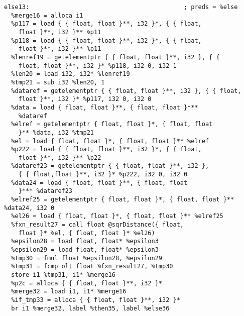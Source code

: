 \documentclass[main.tex]{subfiles}
\begin{document}
{\begin{lstlisting}
else13:                                           ; preds = %else
  %merge16 = alloca i1
  %p117 = load { { float, float }**, i32 }*, { { float,
    float }**, i32 }** %p11
  %p118 = load { { float, float }**, i32 }*, { { float, 
    float }**, i32 }** %p11
  %lenref19 = getelementptr { { float, float }**, i32 }, { { 
    float, float }**, i32 }* %p118, i32 0, i32 1
  %len20 = load i32, i32* %lenref19
  %tmp21 = sub i32 %len20, 1
  %dataref = getelementptr { { float, float }**, i32 }, { { float,
    float }**, i32 }* %p117, i32 0, i32 0
  %data = load { float, float }**, { float, float }***
    %dataref
  %elref = getelementptr { float, float }*, { float, float
    }** %data, i32 %tmp21
  %el = load { float, float }*, { float, float }** %elref
  %p222 = load { { float, float }**, i32 }*, { { float, 
    float }**, i32 }** %p22
  %dataref23 = getelementptr { { float, float }**, i32 }, 
    { { float,float }**, i32 }* %p222, i32 0, i32 0
  %data24 = load { float, float }**, { float, float 
    }*** %dataref23
  %elref25 = getelementptr { float, float }*, { float, float }** %data24, i32 0
  %el26 = load { float, float }*, { float, float }** %elref25
  %fxn_result27 = call float @sqrDistance({ float,
    float }* %el, { float, float }* %el26)
  %epsilon28 = load float, float* %epsilon3
  %epsilon29 = load float, float* %epsilon3
  %tmp30 = fmul float %epsilon28, %epsilon29
  %tmp31 = fcmp olt float %fxn_result27, %tmp30
  store i1 %tmp31, i1* %merge16
  %p2c = alloca { { float, float }**, i32 }*
  %merge32 = load i1, i1* %merge16
  %if_tmp33 = alloca { { float, float }**, i32 }*
  br i1 %merge32, label %then35, label %else36


\end{lstlisting}}
\end{document}
